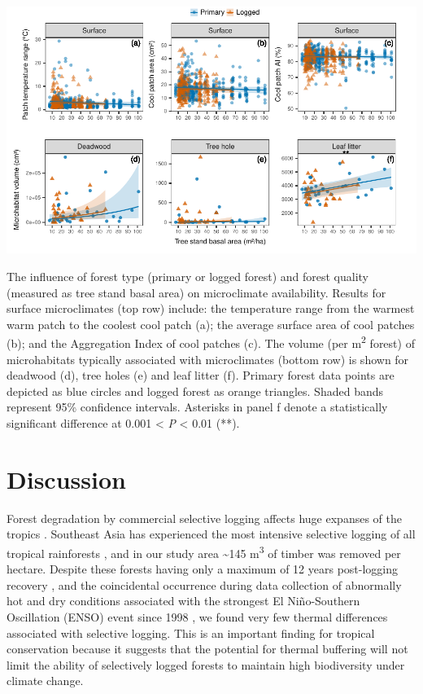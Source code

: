 \documentclass[12pt,a4paper,]{report}
\theoremstyle{definition}
\theoremstyle{definition}
\theoremstyle{definition}
\theoremstyle{remark}
\begin{document}
\begin{center}\includegraphics{./output/fig-4-5-1} \end{center}

The influence of forest type (primary or logged forest) and forest
quality (measured as tree stand basal area) on microclimate
availability. Results for surface microclimates (top row) include: the
temperature range from the warmest warm patch to the coolest cool patch
(a); the average surface area of cool patches (b); and the Aggregation
Index of cool patches (c). The volume (per m\textsuperscript{2} forest)
of microhabitats typically associated with microclimates (bottom row) is
shown for deadwood (d), tree holes (e) and leaf litter (f). Primary
forest data points are depicted as blue circles and logged forest as
orange triangles. Shaded bands represent 95\% confidence intervals.
Asterisks in panel f denote a statistically significant difference at
0.001 \textless{} \emph{P} \textless{} 0.01 (**).

\section{Discussion}\label{discussion-1}

Forest degradation by commercial selective logging affects huge expanses
of the tropics \citep{asner_contemporary2009, lewis_increasing2015}.
Southeast Asia has experienced the most intensive selective logging of
all tropical rainforests \citep{lewis_increasing2015}, and in our study
area \textasciitilde{}145 m\textsuperscript{3} of timber was removed per
hectare. Despite these forests having only a maximum of 12 years
post-logging recovery \citep{fisher_cost-effective2011}, and the
coincidental occurrence during data collection of abnormally hot and dry
conditions associated with the strongest El Niño-Southern Oscillation
(ENSO) event since 1998 \citep{noaa2015}, we found very few thermal
differences associated with selective logging. This is an important
finding for tropical conservation because it suggests that the potential
for thermal buffering will not limit the ability of selectively logged
forests to maintain high biodiversity under climate change.
\end{document}
